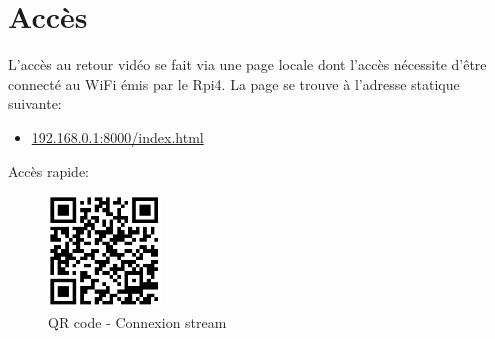 \section{Accès}
L'accès au retour vidéo se fait via une page locale dont l'accès nécessite d'être connecté au WiFi émis par le Rpi4.
La page se trouve à l'adresse statique suivante:
\begin{itemize}
    \item  \url{192.168.0.1:8000/index.html}
\end{itemize}
Accès rapide:

\begin{figure}[H]
    \centering
    \includegraphics[width=3cm]{assets/figures/acces_stream.PNG}
    \caption{QR code - Connexion stream}
\end{figure}